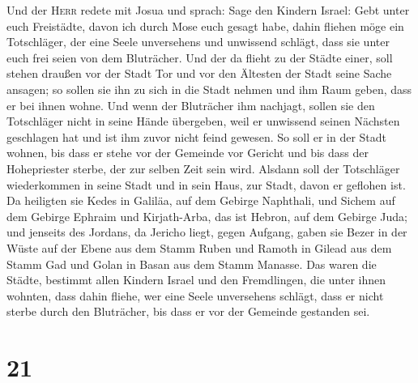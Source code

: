  Und der \textsc{Herr} redete mit Josua und sprach:
 Sage den Kindern Israel: Gebt unter euch Freistädte,
davon ich durch Mose euch gesagt habe,  dahin fliehen möge
ein Totschläger, der eine Seele unversehens und unwissend schlägt, dass
sie unter euch frei seien von dem Bluträcher.  Und der da
flieht zu der Städte einer, soll stehen draußen vor der Stadt Tor und
vor den Ältesten der Stadt seine Sache ansagen; so sollen sie ihn zu
sich in die Stadt nehmen und ihm Raum geben, dass er bei ihnen wohne.
 Und wenn der Bluträcher ihm nachjagt, sollen sie den
Totschläger nicht in seine Hände übergeben, weil er unwissend seinen
Nächsten geschlagen hat und ist ihm zuvor nicht feind gewesen.
 So soll er in der Stadt wohnen, bis dass er stehe vor der
Gemeinde vor Gericht und bis dass der Hohepriester sterbe, der zur
selben Zeit sein wird. Alsdann soll der Totschläger wiederkommen in
seine Stadt und in sein Haus, zur Stadt, davon er geflohen ist.
 Da heiligten sie Kedes in Galiläa, auf dem Gebirge
Naphthali, und Sichem auf dem Gebirge Ephraim und Kirjath-Arba, das ist
Hebron, auf dem Gebirge Juda;  und jenseits des Jordans,
da Jericho liegt, gegen Aufgang, gaben sie Bezer in der Wüste auf der
Ebene aus dem Stamm Ruben und Ramoth in Gilead aus dem Stamm Gad und
Golan in Basan aus dem Stamm Manasse.  Das waren die
Städte, bestimmt allen Kindern Israel und den Fremdlingen, die unter
ihnen wohnten, dass dahin fliehe, wer eine Seele unversehens schlägt,
dass er nicht sterbe durch den Bluträcher, bis dass er vor der Gemeinde
gestanden sei.

\hypertarget{section-20}{%
\section{21}\label{section-20}}

